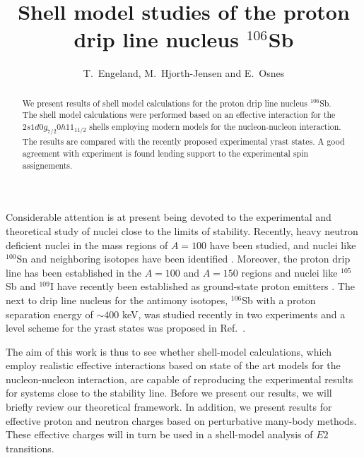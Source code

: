 



\draft

\title{Shell model studies of the proton drip line nucleus $^{106}$Sb}

\author{T.\ Engeland, M.\ Hjorth-Jensen and E.\ Osnes}

\address{Department of Physics,
         University of Oslo, N-0316 Oslo, Norway}

\maketitle

\begin{abstract}

We present results of shell model calculations for the proton drip
line nucleus $^{106}$Sb.
The shell model calculations were performed based on an effective
interaction for the $2s1d0g_{7/2}0h11_{11/2}$ shells employing 
modern models for the nucleon-nucleon interaction. 
The results are compared with the recently 
proposed experimental yrast states. 
A good agreement with experiment 
is found lending support to the experimental
spin assignements. 
\end{abstract}



Considerable attention is at present being devoted to the
experimental and theoretical study of nuclei close to the limits
of stability. Recently, heavy neutron deficient nuclei in the mass
regions of $A=100$ have been studied, and nuclei like $^{100}$Sn
and neighboring isotopes have been identified \cite{sn100a,sn100b,sn100c}.
Moreover, the proton drip line has been established in the $A=100$
and $A=150$ regions \cite{protondripline} and nuclei like
$^{105}$Sb and $^{109}$I have recently  been established as  ground-state 
proton emitters \cite{sb105,i109}.
The next to drip line nucleus for the antimony isotopes, $^{106}$Sb
with a proton separation energy of $\sim 400$ keV, was studied recently
in two experiments and a level scheme for the yrast states was proposed
in Ref.~\cite{sb106}.

The aim of this work is thus to see whether shell-model calculations,
which
employ realistic effective interactions based on state of the art 
models for the nucleon-nucleon interaction,  
are capable of reproducing
the experimental results for systems close to the stability line.
Before we present  our results, we will briefly 
review  our theoretical framework.
In addition, we present results
for effective proton and neutron charges based on perturbative
many-body methods. These effective charges will in turn
be used in a shell-model analysis of $E2$ transitions.

